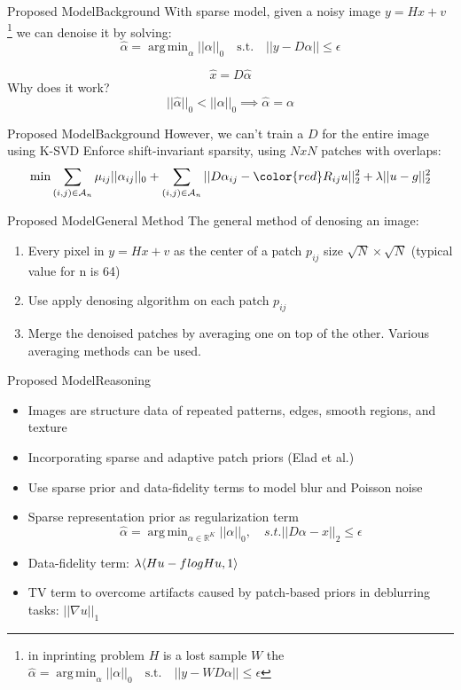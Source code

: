\documentclass{beamer}
\DeclareMathOperator*{\argmin}{arg\,min}
\begin{document}
\begin{frame}{Proposed Model}{Background}
With sparse model, given a noisy image $y=Hx+v$ \footnote{in inprinting problem $H$ is a lost sample $W$ the   $\hat{\alpha} = \argmin_{\alpha}||\alpha||_0 \quad
    \textrm{s.t.} \quad
    ||y-WD\alpha||\le \epsilon$ } we can denoise it by solving:
\[
    \hat{\alpha} = \argmin_{\alpha}||\alpha||_0 \quad
    \textrm{s.t.} \quad
    ||y-D\alpha||\le \epsilon
\]

\[
    \hat{x} = D\hat{\alpha} 
\]
Why does it work?
\[
    ||\hat{\alpha}||_0<||\alpha||_0 \implies \hat{\alpha} = \alpha
\]
\end{frame}


\begin{frame}{Proposed Model}{Background}
However, we can't train a $D$ for the entire image using K-SVD
Enforce shift-invariant sparsity, using $NxN$ patches with overlaps:
\[\min \sum_{(i,j) \in \mathcal{A}_n}{} \mu_{ij}||\alpha_{ij}||_0 + \sum_{(i,j) \in \mathcal{A}_n}{} ||D\alpha_{ij} - {\color{red} R_{ij}}u||^2_2  + \lambda ||u-g||^2_2\]
\end{frame}

\begin{frame}{Proposed Model}{General Method}
The general method of denosing an image:
\begin{enumerate}
    \item Every pixel in $y=Hx+v$ as the center of a patch $p_{ij}$ size $\sqrt{N}\times\sqrt{N}$ (typical value for n is 64)
    \item Use apply denosing algorithm on each patch $p_{ij}$
    \item Merge the denoised patches by averaging one on top of the other. Various averaging methods can be used.
\end{enumerate}
\end{frame}

\begin{frame}[t]{Proposed Model}{Reasoning}
\begin{itemize}
    \item Images are structure data of repeated patterns, edges, smooth regions, and texture
    \item Incorporating sparse and adaptive patch priors (Elad et al.)
    \item Use sparse prior and data-fidelity terms to model blur and Poisson noise
    \item Sparse representation prior as regularization term 
        \[
            \hat{\alpha}=\argmin_{\alpha \in \mathbb{R}^K}||\alpha||_0, \quad s.t. ||D\alpha - x||_2 \le \epsilon 
        \]
    \item Data-fidelity term: $\lambda\langle Hu-f\hspace{0.25pt}log Hu,1\rangle$
    \item TV term  to overcome artifacts caused by patch-based priors in deblurring tasks: $||\nabla u||_1$
\end{itemize}
\end{frame}
\end{document}

